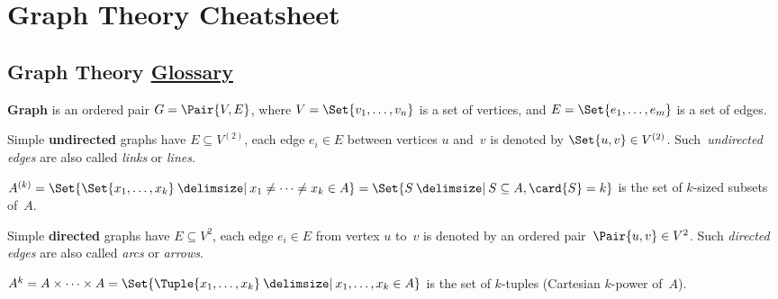 \documentclass[a4paper,10pt]{article}
\begin{document}

\setcounter{section}{4}
\section{Graph Theory Cheatsheet}

\subsection{Graph Theory%
\texorpdfstring{\normalsize\protect{}\hfill\href{https://en.wikipedia.org/wiki/Glossary_of_graph_theory}{Glossary}}{}}

\begin{terms}
    \item \textbf{Graph} is an ordered pair $G = \Pair{V, E}$, where $V = \Set{v_1,\dotsc,v_n}$ is a set of vertices, and $E = \Set{e_1,\dotsc,e_m}$ is a set of edges.

    \item Simple \textbf{undirected} graphs have $E \subseteq V^{(2)}$, \ie each edge $e_i \in E$ between vertices $u$ and~$v$ is denoted by $\Set{u,v} \in V^{(2)}$.
    Such~\emph{undirected edges} are also called \emph{links} or \emph{lines}.
    \begin{terms}
        \item $A^{(k)} = \Set{\Set{x_1,\dotsc,x_k} \given x_1 \neq \dotsb \neq x_k \in A} = \Set{ S \given S \subseteq A, \card{S} = k }$ is the set of $k$-sized subsets of~$A$.
    \end{terms}

    \item Simple \textbf{directed} graphs have $E \subseteq V^{2}$, \ie each edge $e_i \in E$ from vertex $u$ to~$v$ is denoted by an ordered pair~$\Pair{u,v} \in V^{2}$.
    Such \emph{directed edges} are also called \emph{arcs} or \emph{arrows}.
    \begin{terms}
        \item $A^k = A \times \dotsb \times A = \Set{\Tuple{x_1,\dotsc,x_k} \given x_1,\dotsc,x_k \in A}$ is the set of $k$-tuples (Cartesian $k$-power of~$A$).
    \end{terms}

    \begin{minipage}{\linewidth}


\end{minipage}
\end{terms}
\end{document}
